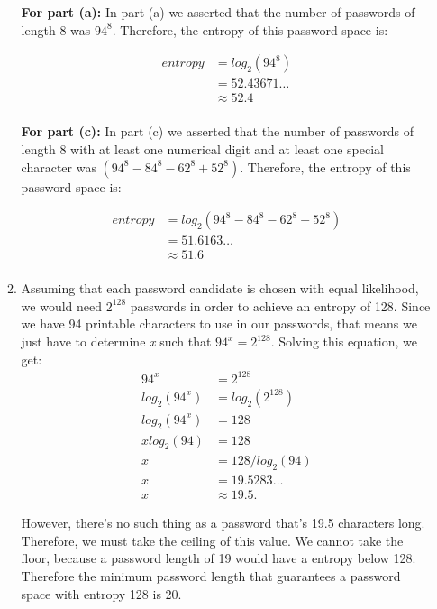 \documentclass[11pt]{article}
\theoremstyle{definition}
\begin{document}
\begin{enumerate}
\begin{enumerate}
\textbf{For part (a):} In part (a) we asserted that the number of passwords of length 8 was $94^8$. Therefore, the entropy of this password space is:

\begin{align*}
entropy &= log_2(94^8)\\
&= 52.43671\ldots \\
&\approx 52.4\\
\end{align*}

\textbf{For part (c):} In part (c) we asserted that the number of passwords of length 8 with at least one numerical digit and at least one special character was $(94^8 - 84^8 - 62^8 + 52^8)$.
Therefore, the entropy of this password space is:

\begin{align*}
entropy &= log_2(94^8 - 84^8 - 62^8 + 52^8)\\
&= 51.6163\ldots \\
&\approx 51.6\\
\end{align*}

\item Assuming that each password candidate is chosen with equal likelihood, we would need $2^{128}$ passwords in order to achieve an entropy of 128.
Since we have 94 printable characters to use in our passwords, that means we just have to determine \textit{x} such that $94^x = 2^{128}$. Solving this equation, we get:\\

\begin{align*}
94^x &= 2^{128}\\
log_2(94^x) &= log_2(2^{128})\\
log_2(94^x) &= 128\\
x log_2(94) &= 128\\
x &= 128 / log_2(94)\\
x &=  19.5283 \ldots \\
x&\approx 19.5.
\end{align*}

However, there's no such thing as a password that's 19.5 characters long. Therefore, we must take the ceiling of this value. We cannot take the floor, because a password length
of 19 would have a entropy below 128. Therefore the minimum password length that guarantees a password space with entropy 128 is 20.

\end{enumerate}

\newpage


\end{enumerate}
\end{document}
